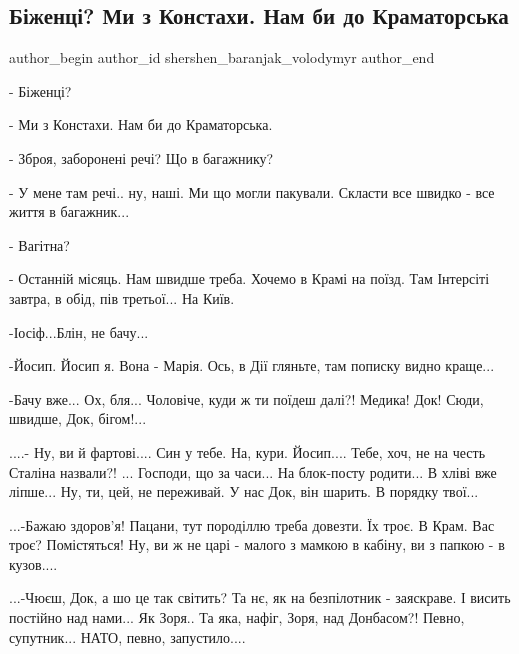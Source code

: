  
 
 
 
 

\subsection{Біженці? Ми з Констахи. Нам би до Краматорська}
\label{sec:25_12_2022.fb.shershen_baranjak_volodymyr.1.b_zhents__mi_z_kons}

\ifcmt
 author_begin
   author_id shershen_baranjak_volodymyr
 author_end
\fi

- Біженці?

- Ми з Констахи. Нам би до Краматорська.  

- Зброя, заборонені речі? Що в багажнику?

- У мене там речі.. ну, наші. Ми що могли пакували. Скласти все швидко - все
життя в багажник...

- Вагітна?

- Останній місяць. Нам швидше треба. Хочемо в Крамі на поїзд. Там Інтерсіті
завтра, в обід, пів третьої... На Київ. 

-Іосіф...Блін, не  бачу... 

-Йосип. Йосип я. Вона - Марія.  Ось, в Дії гляньте, там пописку видно краще... 

-Бачу вже... Ох, бля... Чоловіче, куди ж ти поїдеш далі?! Медика! Док! Сюди,
швидше, Док, бігом!... 

....- Ну, ви й фартові.... Син у тебе. На, кури. Йосип.... Тебе, хоч, не  на
честь Сталіна назвали?! ... Господи, що за часи... На блок-посту родити... В
хліві вже ліпше... Ну, ти, цей, не переживай. У нас Док, він шарить. В порядку
твої...

...-Бажаю здоров'я! Пацани, тут породіллю треба довезти. Їх троє. В Крам.  Вас
троє? Помістяться! Ну, ви ж не царі - малого з мамкою в кабіну, ви з папкою - в
кузов....

...-Чюєш, Док, а шо це так світить? Та нє, як на безпілотник - заяскраве. І
висить постійно над нами... Як Зоря.. Та яка, нафіг, Зоря, над Донбасом?!
Певно, супутник... НАТО, певно, запустило.... 

